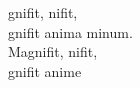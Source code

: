 \begin{cancion}[Magnificat][Taizé]%
	gnifit, nifit,\\
	gnifit anima  minum.\\
	Magnifit, nifit,\\
	gnifit anime\\
\end{cancion}%
